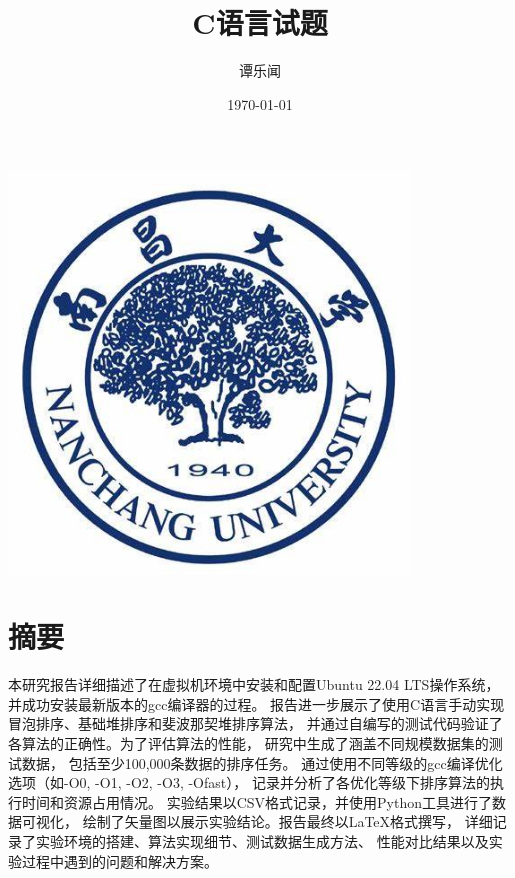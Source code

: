 \documentclass[UTF8]{ctexart}
\title{C语言试题}
\author{谭乐闻}
\date{\today}
\begin{document}
\fancyhf{}
\fancyfoot[C]{\thepage}

\begin{titlingpage} %
    \centering
    \includegraphics[width=0.8\textwidth]{picture/logo2.jpg}

    \vspace{1cm} %

    {\Huge \thetitle\par} %
    \vspace{1cm}
    {\Large \theauthor\par} %
    \vfill
    {\large \thedate\par} %
\end{titlingpage}

\newpage

\tableofcontents  %

\newpage
\section{摘要}
本研究报告详细描述了在虚拟机环境中安装和配置Ubuntu 22.04 LTS操作系统，
并成功安装最新版本的gcc编译器的过程。
报告进一步展示了使用C语言手动实现冒泡排序、基础堆排序和斐波那契堆排序算法，
并通过自编写的测试代码验证了各算法的正确性。为了评估算法的性能，
研究中生成了涵盖不同规模数据集的测试数据，
包括至少100,000条数据的排序任务。
通过使用不同等级的gcc编译优化选项（如-O0, -O1, -O2, -O3, -Ofast），
记录并分析了各优化等级下排序算法的执行时间和资源占用情况。
实验结果以CSV格式记录，并使用Python工具进行了数据可视化，
绘制了矢量图以展示实验结论。报告最终以LaTeX格式撰写，
详细记录了实验环境的搭建、算法实现细节、测试数据生成方法、
性能对比结果以及实验过程中遇到的问题和解决方案。
\end{document}
